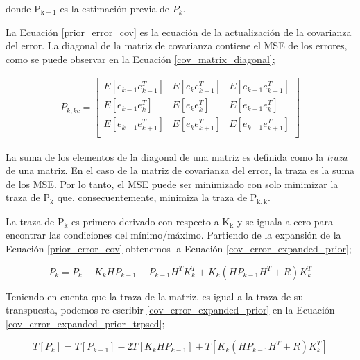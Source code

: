 \documentclass[10pt, a4paper]{report}
\begin{document}
donde $\mathrm{P_{k-1}}$ es la estimaci\'on previa de $P_k$.

La Ecuaci\'on \ref{prior_error_cov} es la ecuaci\'on de la actualizaci\'on de la
covarianza del error. La diagonal de la matriz de covarianza contiene el
\acrshort{MSE} de los errores, como se puede observar en la Ecuaci\'on
\ref{cov_matrix_diagonal};

\begin{gather}
    P_{k,kc}  = \begin{bmatrix}
E\left[e_{k-1}e^T_{k-1}\right]  & E\left[e_ke^T_{k-1}\right] & E\left[e_{k+1}e^T_{k-1}\right] \\
E\left[e_{k-1}e^T_k\right]  & E\left[e_ke^T_k\right] & E\left[e_{k+1}e^T_k\right] \\
E\left[e_{k-1}e^T_{k+1}\right]  & E\left[e_ke^T_{k+1}\right] & E\left[e_{k+1}e^T_{k+1}\right] \\
                \end{bmatrix}\label{cov_matrix_diagonal}
\end{gather}

La suma de los elementos de la diagonal de una matriz es definida como la
\emph{traza} de una matriz. En el caso de la matriz de covarianza del error,
la traza es la suma de los \acrshort{MSE}. Por lo tanto, el \acrshort{MSE} puede
ser minimizado con solo minimizar la traza de $\mathrm{P_k}$ que,
consecuentemente, minimiza la traza de $\mathrm{P_{k,k}}$.

La traza de $\mathrm{P_k}$ es primero derivado con respecto a $\mathrm{K_k}$ y
se iguala a cero para encontrar las condiciones del m\'inimo/m\'aximo. Partiendo
de la expansi\'on de la Ecuaci\'on \ref{prior_error_cov} obtenemos la Ecuaci\'on
\ref{cov_error_expanded_prior};

\begin{equation}
    P_k = P_k - K_kHP_{k-1} - P_{k-1}H^TK_k^T + K_k\left(HP_{k-1}H^T + R\right)K_k^T\label{cov_error_expanded_prior}
\end{equation}

Teniendo en cuenta que la traza de la matriz, es igual a la traza de su
transpuesta, podemos re-escribir \ref{cov_error_expanded_prior} en la Ecuaci\'on
\ref{cov_error_expanded_prior_trpsed};

\begin{equation}
    T\left[P_k\right] = T\left[P_{k-1}\right] - 2T\left[K_kHP_{k-1}\right] +
    T\left[K_k\left(HP_{k-1}H^T + R\right)K_k^T\right]
    \label{cov_error_expanded_prior_trpsed}
\end{equation}
\end{document}
